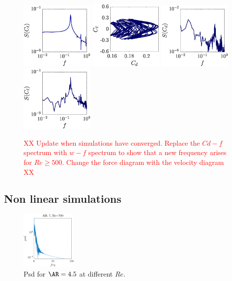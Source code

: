 \begin{figure}
  \includegraphics[width=0.32\textwidth]{./fig/AR5p5/cl_f_Re500.eps}
  \includegraphics[width=0.32\textwidth]{./fig/AR5p5/cl_cd_Re550.eps}
  \includegraphics[width=0.32\textwidth]{./fig/AR5p5/cd_f_Re550.eps} 
  \includegraphics[width=0.32\textwidth]{./fig/AR5p5/cl_f_Re550.eps} 
  \caption{\textcolor{red}{XX Update when simulations have converged. Replace the $Cd-f$ spectrum with $w-f$ spectrum to show that a new frequency arises for $Re \ge 500$. Change the force diagram with the velocity diagram XX}}
  \label{fig:clcd-ar5p5}   
\end{figure}
   

\subsection{Non linear simulations}

\iffalse
\begin{figure}
  \centering
  \includegraphics[width=0.24\textwidth]{./fig/nnl/psdAR7RE700.png}
  \caption{Psd for $\AR=4.5$ at different $Re$.}
  \label{fig:ClCd}
\end{figure}


